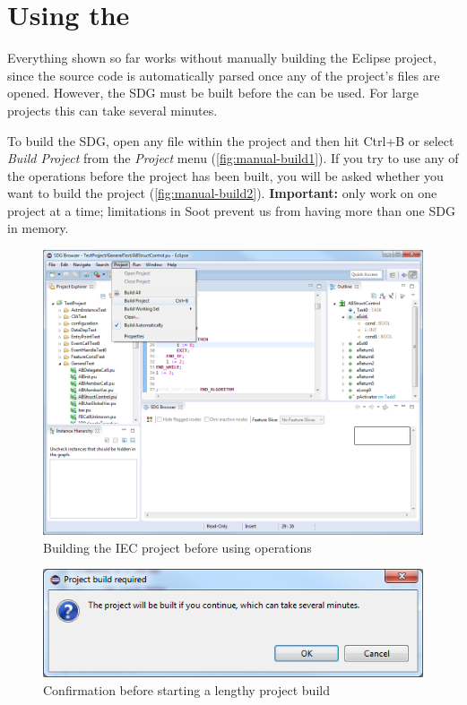 \section{Using the \SB} \label{sec:manual-sdg}

Everything shown so far works without manually building the Eclipse project, since the source code is automatically 
parsed once any of the project's files are opened. However, the SDG must be built before the \SB can be used. For large 
projects this can take several minutes.

To build the SDG, open any file within the project and then hit Ctrl+B or select \emph{Build Project} from the 
\emph{Project} menu (\autoref{fig:manual-build1}). If you try to use any of the \SB operations before the project has 
been built, you will be asked whether you want to build the project (\autoref{fig:manual-build2}). \textbf{Important:} 
only work on one project at a time; limitations in Soot prevent us from having more than one SDG in memory.

\begin{figure}[hp]
  \centering
    \includegraphics[width=\textwidth]{bilder/manual-build1}
  \caption{Building the IEC project before using \SB operations}
  \label{fig:manual-build1}
\end{figure}

\begin{figure}[hp]
  \centering
    \includegraphics[scale=0.55]{bilder/manual-build2}
  \caption{Confirmation before starting a lengthy project build}
  \label{fig:manual-build2}
\end{figure}

